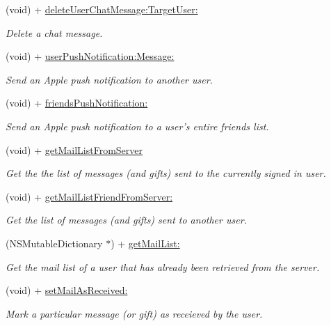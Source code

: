 \begin{DoxyCompactItemize}
(void) + \hyperlink{interface_fuse_a_p_i_a6a0080df180eb01e0f20de0fcce87584}{delete\+User\+Chat\+Message\+:\+Target\+User\+:}
\begin{DoxyCompactList}\small\item\em Delete a chat message. \end{DoxyCompactList}\item 
(void) + \hyperlink{interface_fuse_a_p_i_a84916a862fe925004f0c2d3c2b16aa28}{user\+Push\+Notification\+:\+Message\+:}
\begin{DoxyCompactList}\small\item\em Send an Apple push notification to another user. \end{DoxyCompactList}\item 
(void) + \hyperlink{interface_fuse_a_p_i_a9afa8ec3f16cd18706902dd1f38c3501}{friends\+Push\+Notification\+:}
\begin{DoxyCompactList}\small\item\em Send an Apple push notification to a user's entire friends list. \end{DoxyCompactList}\item 
(void) + \hyperlink{interface_fuse_a_p_i_aad5ae655f49cd199f4b42a8405640692}{get\+Mail\+List\+From\+Server}
\begin{DoxyCompactList}\small\item\em Get the the list of messages (and gifts) sent to the currently signed in user. \end{DoxyCompactList}\item 
(void) + \hyperlink{interface_fuse_a_p_i_ad351b6973d78b9e50b73c3d77c884b90}{get\+Mail\+List\+Friend\+From\+Server\+:}
\begin{DoxyCompactList}\small\item\em Get the list of messages (and gifts) sent to another user. \end{DoxyCompactList}\item 
(N\+S\+Mutable\+Dictionary $\ast$) + \hyperlink{interface_fuse_a_p_i_a53d5fbe19f5f2fe7e3962c75e28a7f4e}{get\+Mail\+List\+:}
\begin{DoxyCompactList}\small\item\em Get the mail list of a user that has already been retrieved from the server. \end{DoxyCompactList}\item 
(void) + \hyperlink{interface_fuse_a_p_i_acf627a33b9debb35ec0896dbae6c0ca0}{set\+Mail\+As\+Received\+:}
\begin{DoxyCompactList}\small\item\em Mark a particular message (or gift) as receieved by the user. \end{DoxyCompactList}\item 

\end{DoxyCompactItemize}
